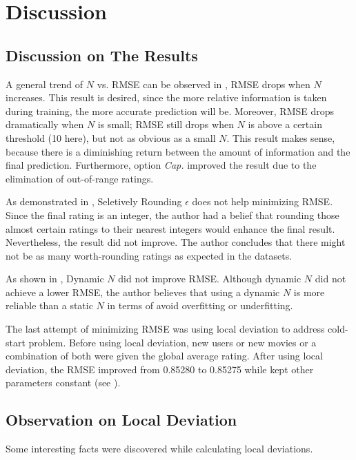 \documentclass{ece}
\begin{document}
\newpage
\section{Discussion}

\subsection{Discussion on The Results}

A general trend of $N$ vs. RMSE can be observed in , RMSE drops when $N$ increases.
This result is desired, since the more relative information is taken during training, the more accurate prediction will be.
Moreover, RMSE drops dramatically when $N$ is small; RMSE still drops when $N$ is above a certain threshold (10 here), but not as obvious as a small $N$.
This result makes sense, because there is a diminishing return between the amount of information and the final prediction.
Furthermore, option \textit{Cap.} improved the result due to the elimination of out-of-range ratings.

As demonstrated in , Seletively Rounding $\epsilon$ does not help minimizing RMSE.
Since the final rating is an integer, the author had a belief that rounding those almost certain ratings to their nearest integers would enhance the final result.
Nevertheless, the result did not improve.
The author concludes that there might not be as many worth-rounding ratings as expected in the datasets.

As shown in , Dynamic $N$ did not improve RMSE.
Although dynamic $N$ did not achieve a lower RMSE, the author believes that using a dynamic $N$ is more reliable than a static $N$ in terms of avoid overfitting or underfitting.

The last attempt of minimizing RMSE was using local deviation to address cold-start problem.
Before using local deviation, new users or new movies or a combination of both were given the global average rating.
After using local deviation, the RMSE improved from 0.85280 to 0.85275 while kept other parameters constant (see ).

\subsection{Observation on Local Deviation}

Some interesting facts were discovered while calculating local deviations.
\end{document}
